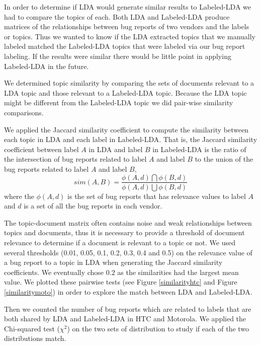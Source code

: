 \documentclass[10pt, conference, compsocconf]{IEEEtran}
\begin{document}
In order to determine if LDA would generate similar results to
Labeled-LDA we had to compare the topics of each.
Both LDA and Labeled-LDA produce matrices of
 the relationships between bug reports of two vendors and the
labels or topics.
Thus we wanted to know if the LDA extracted topics that we manually
labeled matched the Labeled-LDA topics that were labeled via our bug
report labeling. If the results were similar there would be little
point in applying Labeled-LDA in the future.

We determined topic similarity by comparing the sets of documents
relevant to a LDA topic and those relevant to a Labeled-LDA
topic. Because the LDA topic might be different from the Labeled-LDA
topic we did pair-wise similarity comparisons.

We applied the Jaccard similarity coefficient to compute the
similarity between each topic in LDA and each label in Labeled-LDA. 
That is, the Jaccard similarity coefficient between label $A$ in LDA and
label $B$ in Labeled-LDA is the ratio of the intersection of bug reports
related to label $A$ and label $B$ to the union of the bug reports related
to label $A$ and label $B$,
\begin{equation}
sim(A,B) = \frac{\phi(A,d)\bigcap\phi(B,d)}{\phi(A,d)\bigcup\phi(B,d)}
\end{equation}
where the $\phi(A,d)$ is the set of bug reports that has relevance
values to label $A$ and $d$ is a set of all the bug reports in each
vendor.

The topic-document matrix often contains noise and weak
relationships between topics and documents, thus it is necessary to
provide a threshold of document relevance to determine if a document
is relevant to a topic or not.
We used several thresholds (0.01, 0.05, 0.1, 0.2, 0.3, 0.4 and 0.5) on
the relevance value of a bug report to a topic in LDA when generating
the Jaccard similarity coefficients. 
We eventually chose $0.2$ as the similarities had the largest mean
value. 
We plotted these pairwise tests (see Figure \ref{similarityhtc} and
Figure \ref{similaritymoto}) in order to explore the match between
LDA and Labeled-LDA.

Then we counted the number of bug reports which are related to labels
that are both shared by LDA and Labeled-LDA in HTC and Motorola. 
We applied the Chi-squared test ($\chi^2$) on the two sets of distribution to
study if each of the two distributions match.
\end{document}
